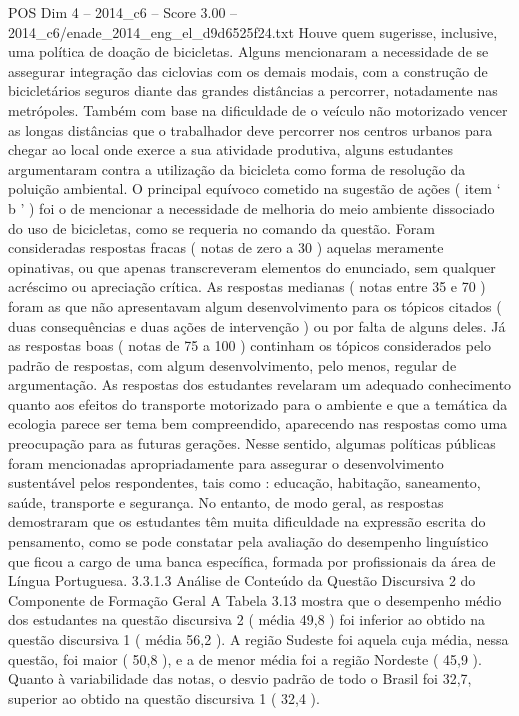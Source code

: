\begin{textsample}{POS Dim 4 – 2014\_c6 – Score 3.00 – 2014\_c6/enade\_2014\_eng\_el\_d9d6525f24.txt}
Houve quem sugerisse, inclusive, uma política de doação de bicicletas.
Alguns mencionaram a necessidade de se assegurar integração das ciclovias com os demais modais, com a construção de bicicletários seguros diante das grandes distâncias a percorrer, notadamente nas metrópoles.
Também com base na dificuldade de o veículo não motorizado vencer as longas distâncias que o trabalhador deve percorrer nos centros urbanos para chegar ao local onde exerce a sua atividade produtiva, alguns estudantes argumentaram contra a utilização da bicicleta como forma de resolução da poluição ambiental.
O principal equívoco cometido na sugestão de ações ( item ‘ b ’ ) foi o de mencionar a necessidade de melhoria do meio ambiente dissociado do uso de bicicletas, como se requeria no comando da questão.
Foram consideradas respostas fracas ( notas de zero a 30 ) aquelas meramente opinativas, ou que apenas transcreveram elementos do enunciado, sem qualquer acréscimo ou apreciação crítica.
As respostas medianas ( notas entre 35 e 70 ) foram as que não apresentavam algum desenvolvimento para os tópicos citados ( duas consequências e duas ações de intervenção ) ou por falta de alguns deles.
Já as respostas boas ( notas de 75 a 100 ) continham os tópicos considerados pelo padrão de respostas, com algum desenvolvimento, pelo menos, regular de argumentação.
As respostas dos estudantes revelaram um adequado conhecimento quanto aos efeitos do transporte motorizado para o ambiente e que a temática da ecologia parece ser tema bem compreendido, aparecendo nas respostas como uma preocupação para as futuras gerações.
Nesse sentido, algumas políticas públicas foram mencionadas apropriadamente para assegurar o desenvolvimento sustentável pelos respondentes, tais como : educação, habitação, saneamento, saúde, transporte e segurança.
No entanto, de modo geral, as respostas demostraram que os estudantes têm muita dificuldade na expressão escrita do pensamento, como se pode constatar pela avaliação do desempenho linguístico que ficou a cargo de uma banca específica, formada por profissionais da área de Língua Portuguesa. 3.3.1.3 Análise de Conteúdo da Questão Discursiva 2 do Componente de Formação Geral A Tabela 3.13 mostra que o desempenho médio dos estudantes na questão discursiva 2 ( média 49,8 ) foi inferior ao obtido na questão discursiva 1 ( média 56,2 ).
A região Sudeste foi aquela cuja média, nessa questão, foi maior ( 50,8 ), e a de menor média foi a região Nordeste ( 45,9 ).
Quanto à variabilidade das notas, o desvio padrão de todo o Brasil foi 32,7, superior ao obtido na questão discursiva 1 ( 32,4 ).

\end{textsample}
